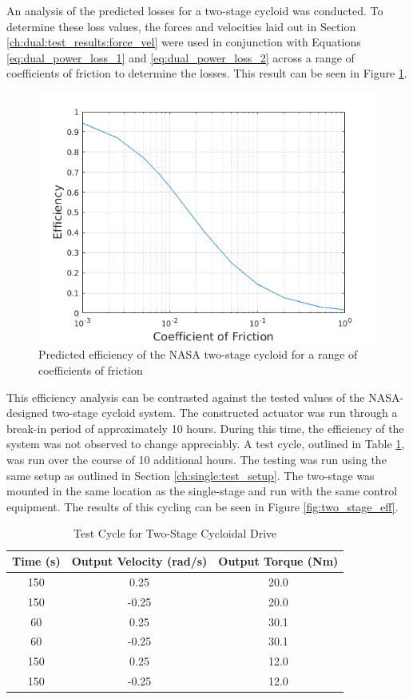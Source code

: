 An analysis of the predicted losses for a two-stage cycloid was conducted. To determine these loss values, the forces and velocities laid out in Section \ref{ch:dual:test_results:force_vel} were used in conjunction with Equations \ref{eq:dual_power_loss_1} and \ref{eq:dual_power_loss_2} across a range of coefficients of friction to determine the losses. This result can be seen in Figure \ref{fig:two_stage_as_designed}.

\begin{figure}[t]
	\centering
	\includegraphics[width=0.75\linewidth]{fig/two_stage_as_designed}
   \caption{Predicted efficiency of the NASA two-stage cycloid for a range of coefficients of friction}
   \label{fig:two_stage_as_designed}
\end{figure}

This efficiency analysis can be contrasted against the tested values of the NASA-designed two-stage cycloid system. The constructed actuator was run through a break-in period of approximately 10 hours. During this time, the efficiency of the system was not observed to change appreciably. A test cycle, outlined in Table \ref{table:two_stage_test_cycle}, was run over the course of 10 additional hours. The testing was run using the same setup as outlined in Section \ref{ch:single:test_setup}. The two-stage was mounted in the same location as the single-stage and run with the same control equipment. The results of this cycling can be seen in Figure \ref{fig:two_stage_eff}.

\begin{table}[t]
  \vskip0.2cm
  \caption{Test Cycle for Two-Stage Cycloidal Drive}
  \label{table:two_stage_test_cycle}
  \begin{center}
    \vskip-0.2cm
    \begin{tabular}{|c||c||c|}
    \hline
    Time (s) & Output Velocity (rad/s) & Output Torque (Nm)\\
    \hline
    150 & 0.25 & 20.0\\
    \hline
    150 & -0.25 & 20.0\\
    \hline
    60 & 0.25 & 30.1\\
    \hline
    60 & -0.25 & 30.1\\
    \hline
    150 & 0.25 & 12.0\\
    \hline
    150 & -0.25 & 12.0\\
    \hline
    \end{tabular}
  \end{center}
\end{table}

